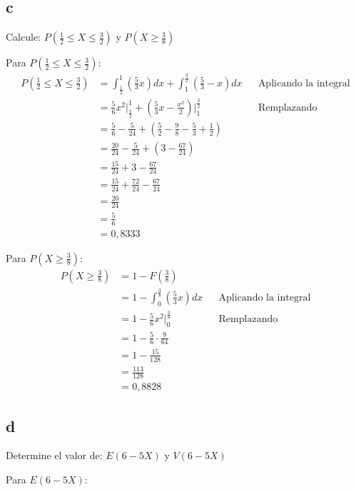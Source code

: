 \documentclass{templateNote}
\begin{document}
\subsection{c}
Calcule: $\displaystyle P\left(\frac{1}{2} \leq X \leq \frac{3}{2}\right)$  y $\displaystyle P\left(X \geq \frac{3}{8}\right)$

Para $\displaystyle P\left(\frac{1}{2} \leq X \leq \frac{3}{2}\right)$:
\begin{align*}
    \displaystyle P\left(\frac{1}{2} \leq X \leq \frac{3}{2}\right) &= \int_{\frac{1}{2}}^{1}{(\frac{5}{3}x)dx} + \int_{1}^{\frac{3}{2}}{{(\frac{5}{3} - x)dx}} && \text{Aplicando la integral} \\
    &= \frac{5}{6}x^2 \Big|_{\frac{1}{2}}^{1} + (\frac{5}{3}x - \frac{x^2}{2}) \Big|_{1}^{\frac{3}{2}} && \text{Remplazando} \\
    &= \frac{5}{6} - \frac{5}{24} + (\frac{5}{2} - \frac{9}{8} - \frac{5}{3} + \frac{1}{2}) \\
    &= \frac{20}{24} - \frac{5}{24} + (3 - \frac{67}{24}) \\
    &= \frac{15}{24} + 3 - \frac{67}{24} \\
    &= \frac{15}{24} + \frac{72}{24} - \frac{67}{24} \\
    &= \frac{20}{24} \\
    &= \frac{5}{6} \\
    &= 0,8333
\end{align*}

Para $\displaystyle P\left(X \geq \frac{3}{8}\right)$:
\begin{align*}
    \displaystyle P\left(X \geq \frac{3}{8}\right) &= 1 - F(\frac{3}{8})\\
    &= 1 - \int_{0}^{\frac{3}{8}}{(\frac{5}{3}x)dx} && \text{Aplicando la integral} \\
    &= 1 - \frac{5}{6}x^2 \Big|_{0}^{\frac{3}{8}} && \text{Remplazando} \\
    &= 1 - \frac{5}{6} \cdot \frac{9}{64} \\
    &= 1 - \frac{15}{128} \\
    &= \frac{113}{128} \\
    &= 0,8828
\end{align*}

\subsection{d}
Determine el valor de: $E(6-5X)$ y $V(6-5X)$

Para $E(6-5X)$:
\end{document}
